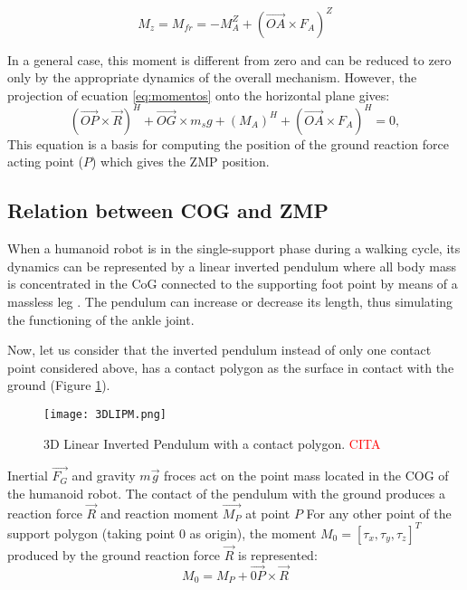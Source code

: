 \begin{equation}
M_z = M_{fr} = -M_A^Z + (\overrightarrow{OA} \times F_A)^Z
\end{equation}

In a general case, this moment is different from zero and can be reduced to zero only by the appropriate dynamics of the overall mechanism. However, the projection of ecuation \eqref{eq:momentos} onto the horizontal plane gives:
\begin{equation}
(\overrightarrow{OP} \times \overrightarrow{R})^H + \overrightarrow{OG} \times m_sg + (M_A)^H + (\overrightarrow{OA} \times F_A)^H = 0,
\label{eq:momentos}
\end{equation}
This equation is a basis for computing the position of the ground reaction force acting point ($P$) which gives the ZMP position.


\subsection{Relation between COG and ZMP}
When a humanoid robot is in the single-support phase during a walking cycle, its dynamics can be represented by a linear inverted pendulum where all body mass is concentrated in the CoG connected to the supporting foot point by means of a massless leg \cite{Kaj2001}. The pendulum can increase or decrease its length, thus simulating the functioning of the ankle joint.

Now, let us consider that the inverted pendulum instead of only one contact point considered above, has a contact polygon as the surface in contact with the ground (Figure \ref{fig:3DLIPM}).

\begin{figure}[!hbt]
\centering
\texttt{[image: 3DLIPM.png]}
\caption{3D Linear Inverted Pendulum with a contact polygon. \textcolor{red}{CITA}}
\label{fig:3DLIPM}
\end{figure}

Inertial $\overrightarrow{F_G}$ and gravity $m\overrightarrow{g}$ froces act on the point mass located in the COG of the humanoid robot. The contact of the pendulum with the ground produces a reaction force $\overrightarrow{R}$ and reaction moment $\overrightarrow{M_P}$ at point $P$ For any other point of the support polygon (taking point 0 as origin), the moment $M_0=[\tau_x, \tau_y, \tau_z]^T$ produced by the ground reaction force $\overrightarrow{R}$ is represented: 
\begin{equation}
M_0 = M_P + \overrightarrow{0P} \times \overrightarrow{R}
\label{eq:M0}
\end{equation}


